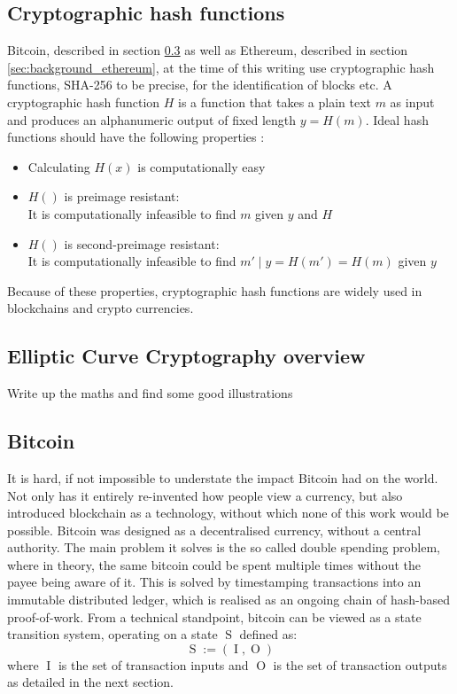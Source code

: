 \documentclass[12pt,msc,a4paper,oneside]{ucl_thesis}
\DeclareMathOperator{\Btcstate}{S}
\DeclareMathOperator{\Btcinput}{I}
\DeclareMathOperator{\Btcoutput}{O}
\begin{document}
\subsection{Cryptographic hash functions}
Bitcoin, described in section \ref{sec:background_bitcoin} as well as Ethereum, described in section \ref{sec:background_ethereum}, at the time of this writing use cryptographic hash functions, SHA-256 to be precise, for the identification of blocks etc. A cryptographic hash function $H$ is a function that takes a plain text $m$ as input and produces an alphanumeric output of fixed length $y = H(m)$. Ideal hash functions should have the following properties \cite{BKarp} \cite{wiki:cryptographic_hash_fn}:
\begin{itemize}
    \item{Calculating $H(x)$ is computationally easy}
    \item{$H()$ is preimage resistant: } \\ It is computationally infeasible to find $m$ given $y$ and $H$
    \item{$H()$ is second-preimage resistant: } \\ It is computationally infeasible to find $m' \mid y=H(m')=H(m)$ given $y$
\end{itemize}
Because of these properties, cryptographic hash functions are widely used in blockchains and crypto currencies.

\subsection{Elliptic Curve Cryptography overview} \label{sec:background_elliptic_curve}
Write up the maths and find some good illustrations




\subsection{Bitcoin} \label{sec:background_bitcoin}
It is hard, if not impossible to understate the impact Bitcoin had on the world. Not only has it entirely re-invented how people view a currency, but also introduced blockchain as a technology, without which none of this work would be possible. Bitcoin was designed as a decentralised currency, without a central authority. The main problem it solves is the so called double spending problem, where in theory, the same bitcoin could be spent multiple times without the payee being aware of it. This is solved by timestamping transactions into an immutable distributed ledger, which is realised as an ongoing chain of hash-based proof-of-work. From a technical standpoint, bitcoin can be viewed as a state transition system, operating on a state $\Btcstate$ defined as:
\begin{equation}
    \Btcstate := (\Btcinput, \Btcoutput)
\end{equation}
where $\Btcinput$ is the set of transaction inputs and $\Btcoutput$ is the set of transaction outputs as detailed in the next section.
\end{document}
